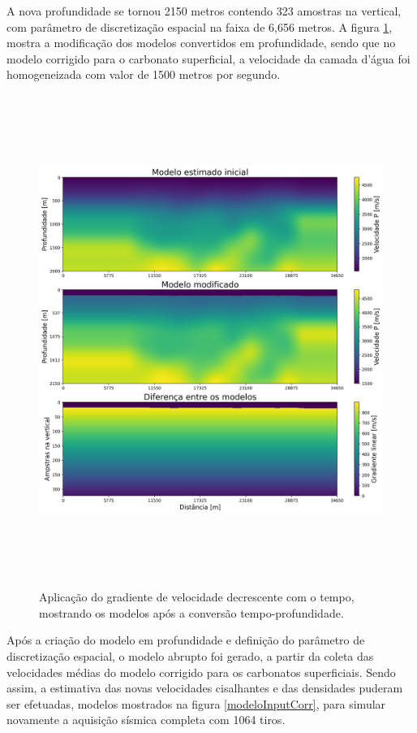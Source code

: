 \documentclass[
	12pt,				%
	openright,			%
	oneside,			%
	a4paper,			%
	english,			%
	brazil				%
	]{abntex2}
\begin{document}
	\newpage 	
	A nova profundidade se tornou 2150 metros contendo 323 amostras na vertical, com parâmetro de discretização espacial na faixa de 6,656 metros. A figura \ref{modificationDepth}, mostra a modificação dos modelos convertidos em profundidade, sendo que no modelo corrigido para o carbonato superficial, a velocidade da camada d'água foi homogeneizada com valor de 1500 metros por segundo.  
	
	\begin{figure}[htp!]
		\centering
		\includegraphics[width=16cm,height=16cm]{../imagens/modificationDepth.png}
		\caption{Aplicação do gradiente de velocidade decrescente com o tempo, mostrando os modelos após a conversão tempo-profundidade.}
		\label{modificationDepth}
	\end{figure}
	
	Após a criação do modelo em profundidade e definição do parâmetro de discretização espacial, o modelo abrupto foi gerado, a partir da coleta das velocidades médias do modelo corrigido para os carbonatos superficiais. Sendo assim, a estimativa das novas velocidades cisalhantes e das densidades puderam ser efetuadas, modelos mostrados na figura \ref{modeloInputCorr}, para simular novamente a aquisição sísmica completa com 1064 tiros. 
\end{document}
